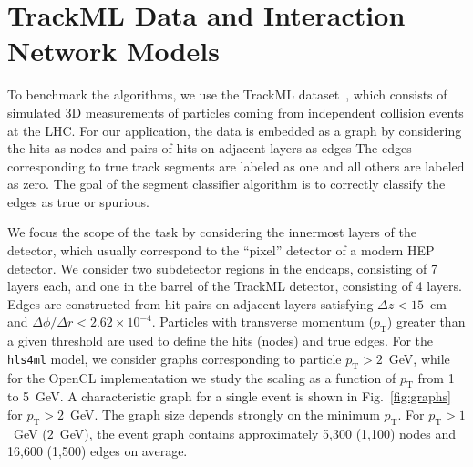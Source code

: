 \documentclass{article}
\newcommand{\TODO}[1]{\textcolor{red}{TODO: #1}}
\newcommand{\hlsfml}{\texttt{hls4ml}\xspace}
\newcommand{\pt}{\ensuremath{p_{\mathrm{T}}}\xspace}
\begin{document}
\section{TrackML Data and Interaction Network Models}
\label{sec:in}


To benchmark the algorithms, we use the TrackML dataset~\cite{Amrouche:2019wmx}, which consists of simulated 3D measurements of particles coming from independent collision events at the LHC.
For our application, the data is embedded as a graph by considering the hits as nodes and pairs of hits on adjacent layers as edges
The edges corresponding to true track segments are labeled as one and all others are labeled as zero.
The goal of the segment classifier algorithm is to correctly classify the edges as true or spurious.

We focus the scope of the task by considering the innermost layers of the detector, which usually correspond to the ``pixel'' detector of a modern HEP detector. 
We consider two subdetector regions in the endcaps, consisting of 7 layers each, and one in the barrel of the TrackML detector, consisting of 4 layers.
Edges are constructed from hit pairs on adjacent layers satisfying $\Delta z < 15$~cm and $\Delta\phi / \Delta r < 2.62\times 10^{-4}$.
Particles with transverse momentum ($\pt$) greater than a given threshold are used to define the hits (nodes) and true edges.
For the \hlsfml model, we consider graphs corresponding to particle $\pt>2$~GeV, while for the OpenCL implementation we study the scaling as a function of $\pt$ from 1 to 5~GeV. 
A characteristic graph for a single event is shown in Fig.~\ref{fig:graphs} for $\pt>2$~GeV.
The graph size depends strongly on the minimum $\pt$.
For $\pt > 1$~GeV ($2$~GeV), the event graph contains approximately 5,300 (1,100) nodes and 16,600 (1,500) edges on average.
\end{document}
